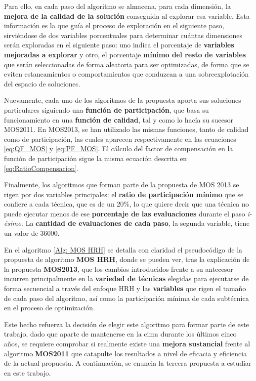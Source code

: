 Para ello, en cada paso del algoritmo se almacena, para cada dimensión, la \textbf{mejora de la calidad de la solución} conseguida al explorar esa variable. Esta información es la que guía el proceso de exploración en el siguiente paso, sirviéndose de dos variables porcentuales para determinar cuántas dimensiones serán exploradas en el siguiente paso: uno indica el porcentaje de \textbf{variables mejoradas a explorar} y otro, el porcentaje \textbf{mínimo del resto de variables} que serán seleccionadas de forma aleatoria para ser optimizadas, de forma que se eviten estancamientos o comportamientos que conduzcan a una sobreexplotación del espacio de soluciones.

Nuevamente, cada uno de los algoritmos de la propuesta aporta sus soluciones particulares siguiendo una \textbf{función de participación}, que basa su funcionamiento en una \textbf{función de calidad}, tal y como lo hacía su sucesor MOS2011. En MOS2013, se han utilizado las mismas funciones, tanto de calidad como de participación, las cuales aparecen respectivamente en las ecuaciones \ref{eq:QF_MOS} y \ref{eq:PF_MOS}. El cálculo del factor de compensación en la función de participación sigue la misma ecuación descrita en \ref{eq:RatioCompensacion}.

Finalmente, los algoritmos que forman parte de la propuesta de MOS 2013 se rigen por dos variables principales: el \textbf{ratio de participación mínimo} que se confiere a cada técnica, que es de un 20\%, lo que quiere decir que una técnica no puede ejecutar menos de ese \textbf{porcentaje de las evaluaciones} durante el paso \textit{i-ésimo}. La \textbf{cantidad de evaluaciones de cada paso}, la segunda variable, tiene un valor de 36000. 

En el algoritmo \ref{Alg: MOS HRH} se detalla con claridad el pseudocódigo de la propuesta de algoritmo \textbf{MOS HRH}, donde se pueden ver, tras la explicación de la propuesta \textbf{MOS2013}, que los cambios introducidos frente a su antecesor incurren principalmente en la \textbf{variedad de técnicas} elegidas para ejecutarse de forma secuencial a través del enfoque HRH y las \textbf{variables} que rigen el tamaño de cada paso del algoritmo, así como la participación mínima de cada subtécnica en el proceso de optimización.

Este hecho refuerza la decisión de elegir este algoritmo para formar parte de este trabajo, dado que aparte de mantenerse en la cima durante los últimos cinco años, se requiere comprobar si realmente existe una \textbf{mejora sustancial} frente al algoritmo \textbf{MOS2011} que catapulte los resultados a nivel de eficacia y eficiencia de la actual propuesta. A continuación, se enuncia la tercera propuesta a estudiar en este trabajo.

